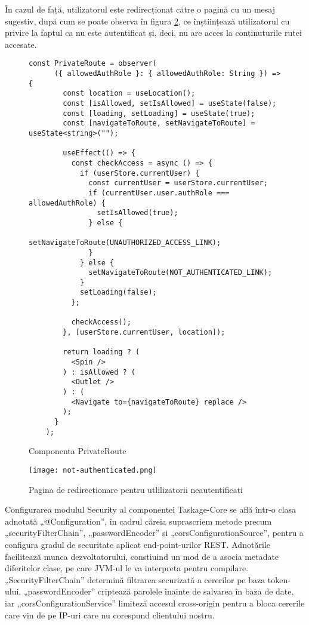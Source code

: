 În cazul de față, utilizatorul este redirecționat către o pagină cu un mesaj sugestiv, după cum se poate observa în figura \ref{not-authenticated}, ce înștiințează utilizatorul cu privire la faptul ca nu este autentificat și, deci, nu are acces la conținuturile rutei accesate.

\begin{figure}[H]
	\begin{lstlisting}[frame=single, style=java]
	const PrivateRoute = observer(
	  ({ allowedAuthRole }: { allowedAuthRole: String }) => {
	    const location = useLocation();
	    const [isAllowed, setIsAllowed] = useState(false);
	    const [loading, setLoading] = useState(true);
	    const [navigateToRoute, setNavigateToRoute] = useState<string>("");
	
	    useEffect(() => {
	      const checkAccess = async () => {
	        if (userStore.currentUser) {
	          const currentUser = userStore.currentUser;
	          if (currentUser.user.authRole === allowedAuthRole) {
	            setIsAllowed(true);
	          } else {
	            setNavigateToRoute(UNAUTHORIZED_ACCESS_LINK);
	          }
	        } else {
	          setNavigateToRoute(NOT_AUTHENTICATED_LINK);
	        }
	        setLoading(false);
	      };
	
	      checkAccess();
	    }, [userStore.currentUser, location]);
	
	    return loading ? (
	      <Spin />
	    ) : isAllowed ? (
	      <Outlet />
	    ) : (
	      <Navigate to={navigateToRoute} replace />
	    );
	  }
	);
	\end{lstlisting}
	\caption{Componenta PrivateRoute}
	\label{private-route}
\end{figure}

 \begin{figure}[ht]
	\centering
 	 \texttt{[image: not-authenticated.png]}
	\caption{Pagina de redirecționare pentru utlilizatorii neautentificați}
	\label{not-authenticated}
 \end{figure}

Configurarea modulul Security al componentei Taskage-Core se află într-o clasa adnotată „@Configuration”, în cadrul căreia suprascriem metode precum „securityFilterChain”, „passwordEncoder” și „corsConfigurationSource”, pentru a configura gradul de securitate aplicat end-point-urilor REST. Adnotările facilitează munca dezvoltatorului, constiuind un mod de a asocia metadate diferitelor clase, pe care JVM-ul le va interpreta pentru compilare. „SecurityFilterChain” determină filtrarea securizată a cererilor pe baza token-ului, „passwordEncoder” criptează parolele înainte de salvarea în baza de date, iar „corsConfigurationService” limiteză accesul cross-origin pentru a bloca cererile care vin de pe IP-uri care nu corespund clientului nostru.

